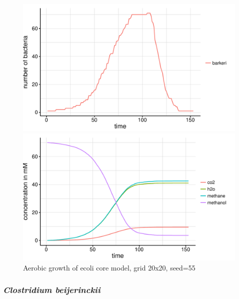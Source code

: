 \begin{figure}[h]
  \centering
  \begin{minipage}[t]{0.45\textwidth}
    \includegraphics[width=\textwidth]{../results/barkeri_20x20_seed9659_growth.pdf}
  \end{minipage}
  \begin{minipage}[t]{0.45\textwidth}
    \includegraphics[width=\textwidth]{../results/barkeri_20x20_seed9659_subs.pdf}
  \end{minipage}
  \caption{Aerobic growth of ecoli core model, grid 20x20, seed=55}
\end{figure}

\subsubsection{\textit{Clostridium beijerinckii}}

